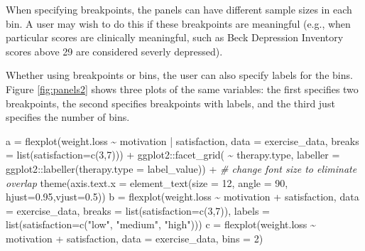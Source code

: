 \documentclass[
  english,
  man]{apa6}
\newenvironment{Shaded}{\begin{snugshade}}{\end{snugshade}}
\newcommand{\AttributeTok}[1]{\textcolor[rgb]{0.77,0.63,0.00}{#1}}
\newcommand{\CommentTok}[1]{\textcolor[rgb]{0.56,0.35,0.01}{\textit{#1}}}
\newcommand{\DecValTok}[1]{\textcolor[rgb]{0.00,0.00,0.81}{#1}}
\newcommand{\FloatTok}[1]{\textcolor[rgb]{0.00,0.00,0.81}{#1}}
\newcommand{\FunctionTok}[1]{\textcolor[rgb]{0.00,0.00,0.00}{#1}}
\newcommand{\NormalTok}[1]{#1}
\newcommand{\OtherTok}[1]{\textcolor[rgb]{0.56,0.35,0.01}{#1}}
\newcommand{\SpecialCharTok}[1]{\textcolor[rgb]{0.00,0.00,0.00}{#1}}
\newcommand{\StringTok}[1]{\textcolor[rgb]{0.31,0.60,0.02}{#1}}
\begin{document}
When specifying breakpoints, the panels can have different sample sizes in each bin. A user may wish to do this if these breakpoints are meaningful (e.g., when particular scores are clinically meaningful, such as Beck Depression Inventory scores above 29 are considered severly depressed).

Whether using breakpoints or bins, the user can also specify labels for the bins. Figure \ref{fig:panels2} shows three plots of the same variables: the first specifies two breakpoints, the second specifies breakpoints with labels, and the third just specifies the number of bins.

\small

\begin{Shaded}
\begin{Highlighting}[]
\NormalTok{a }\OtherTok{=} \FunctionTok{flexplot}\NormalTok{(weight.loss }\SpecialCharTok{\textasciitilde{}}\NormalTok{ motivation }\SpecialCharTok{|}\NormalTok{ satisfaction, }
             \AttributeTok{data =}\NormalTok{ exercise\_data, }
             \AttributeTok{breaks =} \FunctionTok{list}\NormalTok{(}\AttributeTok{satisfaction=}\FunctionTok{c}\NormalTok{(}\DecValTok{3}\NormalTok{,}\DecValTok{7}\NormalTok{))) }\SpecialCharTok{+}
\NormalTok{  ggplot2}\SpecialCharTok{::}\FunctionTok{facet\_grid}\NormalTok{( }\SpecialCharTok{\textasciitilde{}}\NormalTok{ therapy.type, }
              \AttributeTok{labeller =}\NormalTok{ ggplot2}\SpecialCharTok{::}\FunctionTok{labeller}\NormalTok{(}\AttributeTok{therapy.type =}\NormalTok{ label\_value)) }\SpecialCharTok{+}
  \CommentTok{\# change font size to eliminate overlap}
    \FunctionTok{theme}\NormalTok{(}\AttributeTok{axis.text.x =} 
            \FunctionTok{element\_text}\NormalTok{(}\AttributeTok{size =} \DecValTok{12}\NormalTok{, }\AttributeTok{angle =} \DecValTok{90}\NormalTok{, }\AttributeTok{hjust=}\FloatTok{0.95}\NormalTok{,}\AttributeTok{vjust=}\FloatTok{0.5}\NormalTok{))}
\NormalTok{b }\OtherTok{=} \FunctionTok{flexplot}\NormalTok{(weight.loss }\SpecialCharTok{\textasciitilde{}}\NormalTok{ motivation }\SpecialCharTok{+}\NormalTok{ satisfaction, }
             \AttributeTok{data =}\NormalTok{ exercise\_data, }
             \AttributeTok{breaks =} \FunctionTok{list}\NormalTok{(}\AttributeTok{satisfaction=}\FunctionTok{c}\NormalTok{(}\DecValTok{3}\NormalTok{,}\DecValTok{7}\NormalTok{)), }
             \AttributeTok{labels =} \FunctionTok{list}\NormalTok{(}\AttributeTok{satisfaction=}\FunctionTok{c}\NormalTok{(}\StringTok{"low"}\NormalTok{, }\StringTok{"medium"}\NormalTok{, }\StringTok{"high"}\NormalTok{)))}
\NormalTok{c }\OtherTok{=} \FunctionTok{flexplot}\NormalTok{(weight.loss }\SpecialCharTok{\textasciitilde{}}\NormalTok{ motivation }\SpecialCharTok{+}\NormalTok{ satisfaction, }
             \AttributeTok{data =}\NormalTok{ exercise\_data, }
             \AttributeTok{bins =} \DecValTok{2}\NormalTok{) }
\end{Highlighting}
\end{Shaded}
\end{document}

